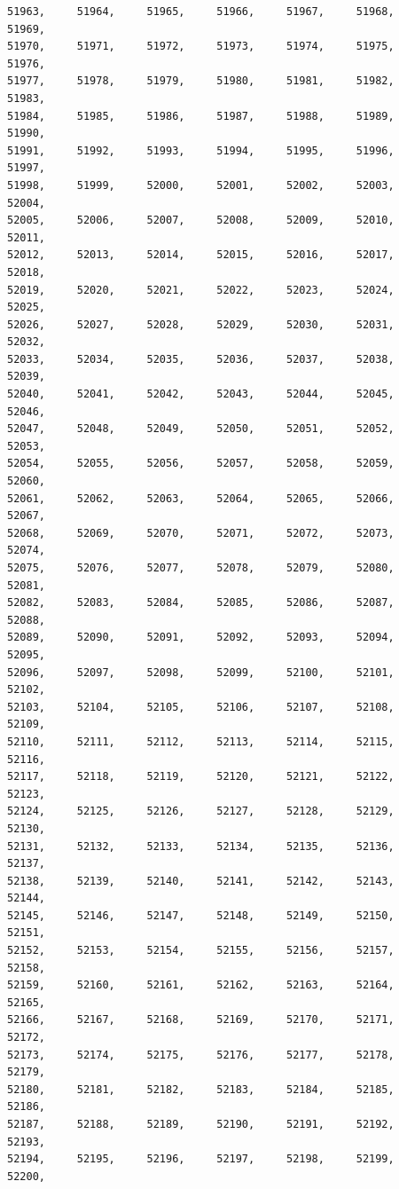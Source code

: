 \documentclass[a4paper,11pt]{report}
\begin{document}
\begin{verbatim}
51963,     51964,     51965,     51966,     51967,     51968,     51969,     
51970,     51971,     51972,     51973,     51974,     51975,     51976,     
51977,     51978,     51979,     51980,     51981,     51982,     51983,     
51984,     51985,     51986,     51987,     51988,     51989,     51990,     
51991,     51992,     51993,     51994,     51995,     51996,     51997,     
51998,     51999,     52000,     52001,     52002,     52003,     52004,     
52005,     52006,     52007,     52008,     52009,     52010,     52011,     
52012,     52013,     52014,     52015,     52016,     52017,     52018,     
52019,     52020,     52021,     52022,     52023,     52024,     52025,     
52026,     52027,     52028,     52029,     52030,     52031,     52032,     
52033,     52034,     52035,     52036,     52037,     52038,     52039,     
52040,     52041,     52042,     52043,     52044,     52045,     52046,     
52047,     52048,     52049,     52050,     52051,     52052,     52053,     
52054,     52055,     52056,     52057,     52058,     52059,     52060,     
52061,     52062,     52063,     52064,     52065,     52066,     52067,     
52068,     52069,     52070,     52071,     52072,     52073,     52074,     
52075,     52076,     52077,     52078,     52079,     52080,     52081,     
52082,     52083,     52084,     52085,     52086,     52087,     52088,     
52089,     52090,     52091,     52092,     52093,     52094,     52095,     
52096,     52097,     52098,     52099,     52100,     52101,     52102,     
52103,     52104,     52105,     52106,     52107,     52108,     52109,     
52110,     52111,     52112,     52113,     52114,     52115,     52116,     
52117,     52118,     52119,     52120,     52121,     52122,     52123,     
52124,     52125,     52126,     52127,     52128,     52129,     52130,     
52131,     52132,     52133,     52134,     52135,     52136,     52137,     
52138,     52139,     52140,     52141,     52142,     52143,     52144,     
52145,     52146,     52147,     52148,     52149,     52150,     52151,     
52152,     52153,     52154,     52155,     52156,     52157,     52158,     
52159,     52160,     52161,     52162,     52163,     52164,     52165,     
52166,     52167,     52168,     52169,     52170,     52171,     52172,     
52173,     52174,     52175,     52176,     52177,     52178,     52179,     
52180,     52181,     52182,     52183,     52184,     52185,     52186,     
52187,     52188,     52189,     52190,     52191,     52192,     52193,     
52194,     52195,     52196,     52197,     52198,     52199,     52200,     

\end{verbatim}
\end{document}
